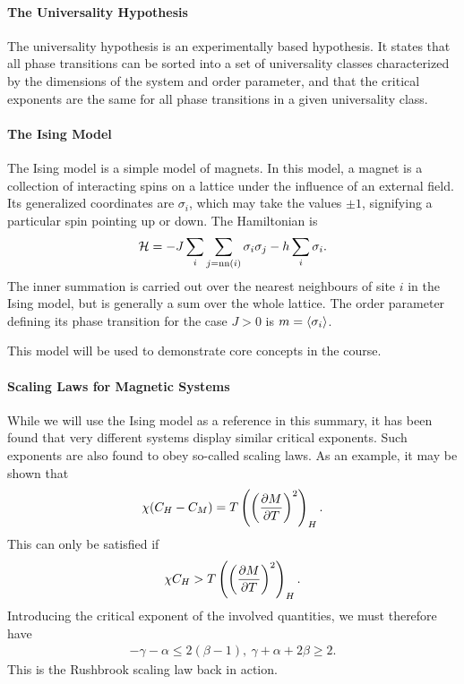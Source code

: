 \paragraph{The Universality Hypothesis}
The universality hypothesis is an experimentally based hypothesis. It states that all phase transitions can be sorted into a set of universality classes characterized by the dimensions of the system and order parameter, and that the critical exponents are the same for all phase transitions in a given universality class.

\paragraph{The Ising Model}
The Ising model is a simple model of magnets. In this model, a magnet is a collection of interacting spins on a lattice under the influence of an external field. Its generalized coordinates are $\sigma_{i}$, which may take the values $\pm 1$, signifying a particular spin pointing up or down. The Hamiltonian is
\begin{align*}
	\mathcal{H} = -J\sum\limits_{i}\sum\limits_{j = \text{nn}(i)}\sigma_{i}\sigma_{j} - h\sum\limits_{i}\sigma_{i}.
\end{align*}
The inner summation is carried out over the nearest neighbours of site $i$ in the Ising model, but is generally a sum over the whole lattice. The order parameter defining its phase transition for the case $J > 0$ is $m = \expval{\sigma_{i}}$.

This model will be used to demonstrate core concepts in the course.

\paragraph{Scaling Laws for Magnetic Systems}
While we will use the Ising model as a reference in this summary, it has been found that very different systems display similar critical exponents. Such exponents are also found to obey so-called scaling laws. As an example, it may be shown that
\begin{align*}
	\chi(C_{H} - C_{M}) = T\left(\left(\pdv{M}{T}\right)^{2}\right)_{H}.
\end{align*}
This can only be satisfied if
\begin{align*}
	\chi C_{H} > T\left(\left(\pdv{M}{T}\right)^{2}\right)_{H}.
\end{align*}
Introducing the critical exponent of the involved quantities, we must therefore have
\begin{align*}
	-\gamma - \alpha \leq 2(\beta - 1),\ \gamma + \alpha + 2\beta \geq 2.
\end{align*}
This is the Rushbrook scaling law back in action.

